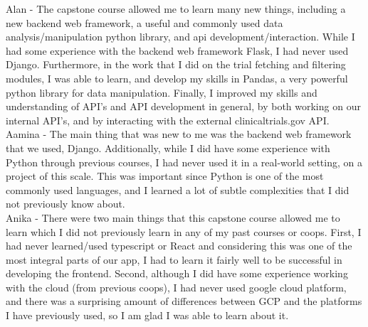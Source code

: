 \documentclass{article}
\begin{document}
    Alan - The capstone course allowed me to learn many new things, including a new backend web framework, a useful and commonly used data analysis/manipulation python library, and api development/interaction. While 
    I had some experience with the backend web framework Flask, I had never used Django. Furthermore, in the work that I did on the trial fetching and filtering modules, I was able to learn, and develop 
    my skills in Pandas, a very powerful python library for data manipulation. Finally, I improved my skills and understanding of API's and API development in general, by both working on our internal 
    API's, and by interacting with the external clinicaltrials.gov API.\\

    Aamina - The main thing that was new to me was the backend web framework that we used, Django. Additionally, while I did have some experience with
    Python through previous courses, I had never used it in a real-world setting, on a project of this scale. This was important since Python is one of the most 
    commonly used languages, and I learned a lot of subtle complexities that I did not previously know about. \\

    Anika - There were two main things that this capstone course allowed me to learn which I did not previously learn in any of my past courses or coops. First, 
    I had never learned/used typescript or React and considering this was one of the most integral parts of our app, I had to learn it fairly well to be successful in 
    developing the frontend. Second, although I did have some experience working with the cloud (from previous coops), I had never used google cloud platform, and there was a surprising amount 
    of differences between GCP and the platforms I have previously used, so I am glad I was able to learn about it.
\end{document}
